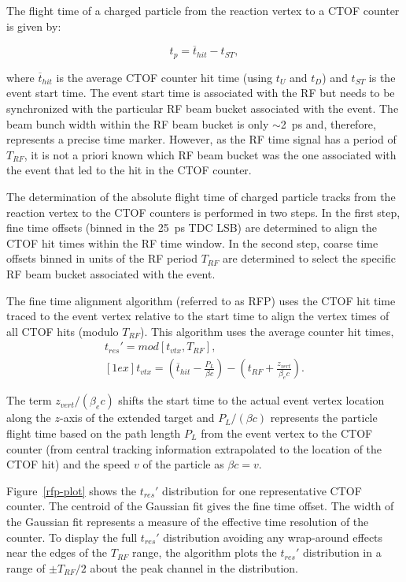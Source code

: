 \documentclass[3p,times,twocolumn]{elsarticle}
\begin{document}
The flight time of a charged particle from the reaction vertex to a CTOF counter is given by:

\begin{equation}
t_p = \overline{t}_{hit} - t_{ST},
\end{equation}

\noindent
where $\overline{t}_{hit}$ is the average CTOF counter hit time (using $t_U$ and $t_D$) and $t_{ST}$
is the event start time. The event start time is associated with the RF but needs to be synchronized
with the particular RF beam bucket associated with the event. The beam bunch width within the RF beam
bucket is only $\sim$2~ps and, therefore, represents a precise time marker. However, as the RF time
signal has a period of $T_{RF}$, it is not a priori known which RF beam bucket was the one associated with
the event that led to the hit in the CTOF counter.

The determination of the absolute flight time of charged particle tracks from the reaction vertex to the
CTOF counters is performed in two steps. In the first step, fine time offsets (binned in the 25~ps TDC
LSB) are determined to align the CTOF hit times within the RF time window. In the second step, coarse
time offsets binned in units of the RF period $T_{RF}$ are determined to select the specific RF beam
bucket associated with the event.

The fine time alignment algorithm (referred to as RFP) uses the CTOF hit time traced to the event vertex
relative to the start time to align the vertex times of all CTOF hits (modulo $T_{RF}$). This algorithm uses
the average counter hit times, 
\begin{eqnarray}
t_{res}' = mod \left[ t_{vtx}, T_{RF} \right], ~~~~~\\ [1ex]
t_{vtx} = \left(\overline{t}_{hit} - \frac{P_L}{\beta c} \right) - 
\left(t_{RF} + \frac{z_{vert}}{\beta_e c} \right). \nonumber
\end{eqnarray}

\noindent
The term $z_{vert}/(\beta_e c)$ shifts the start time to the actual event vertex location along the
$z$-axis of the extended target and $P_L/(\beta c)$ represents the particle flight time based on the
path length $P_L$ from the event vertex to the CTOF counter (from central tracking information
extrapolated to the location of the CTOF hit) and the speed $v$ of the particle as $\beta c = v$.

Figure~\ref{rfp-plot} shows the $t_{res}'$ distribution for one representative CTOF counter. The
centroid of the Gaussian fit gives the fine time offset. The width of the Gaussian fit represents
a measure of the effective time resolution of the counter. To display the full $t_{res}'$ distribution
avoiding any wrap-around effects near the edges of the $T_{RF}$ range, the algorithm plots the
$t_{res}'$ distribution in a range of $\pm T_{RF}/2$ about the peak channel in the distribution.
\end{document}
